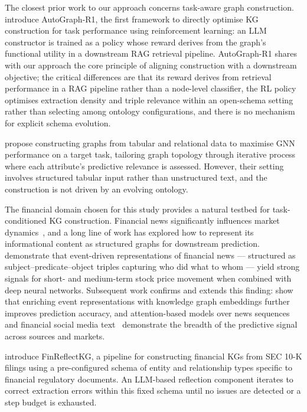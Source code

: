 The closest prior work to our approach concerns task-aware graph construction.
\citet{tsang2025autographr1} introduce AutoGraph-R1, the first framework to directly
optimise KG construction for task performance using reinforcement learning: an LLM
constructor is trained as a policy whose reward derives from the graph's functional utility
in a downstream RAG retrieval pipeline.
AutoGraph-R1 shares with our approach the core principle of aligning construction with a
downstream objective; the critical differences are that its reward derives from retrieval
performance in a RAG pipeline rather than a node-level classifier, the RL policy optimises
extraction density and triple relevance within an open-schema setting rather than selecting
among ontology configurations, and there is no mechanism for explicit schema evolution.

\citet{cucumides2025augraph} propose constructing graphs from tabular and relational data
to maximise GNN performance on a target task, tailoring graph topology through iterative
process where each attribute's predictive
relevance is assessed. However, their setting involves structured tabular input rather than unstructured
text, and the construction is not driven by an evolving ontology.

The financial domain chosen for this study provides a natural testbed for task-conditioned KG construction.
Financial news significantly influences market dynamics~\citep{dong2024fnspid}, and a long
line of work has explored how to represent its informational content as structured graphs
for downstream prediction.
\citet{ding2015stock} demonstrate that event-driven representations of financial
news --- structured as subject--predicate--object triples capturing who did what to whom
--- yield strong signals for short- and medium-term stock price movement when combined with deep neural
networks.
Subsequent work confirms and extends this finding: \citet{ding2016kgeventstock} show that
enriching event representations with knowledge graph embeddings further improves prediction
accuracy, and attention-based models over news sequences~\citep{hu2018chaoticwhispers} and
financial social media text~\citep{xu2018stocktweets} demonstrate the breadth of the
predictive signal across sources and markets.

\citet{arun2025finreflectkg} introduce FinReflectKG, a pipeline for constructing financial
KGs from SEC 10-K filings using a pre-configured schema of entity and relationship types
specific to financial regulatory documents.
An LLM-based reflection component iterates to correct extraction errors within this fixed
schema until no issues are detected or a step budget is exhausted.

